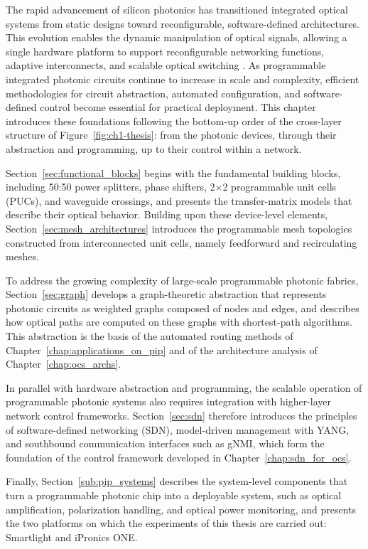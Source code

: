 The rapid advancement of silicon photonics has transitioned integrated optical systems from static designs toward reconfigurable, software-defined architectures.
This evolution enables the dynamic manipulation of optical signals, allowing a single hardware platform to support reconfigurable networking functions, adaptive interconnects, and scalable optical switching \cite{bogaerts2020programmable}.
As programmable integrated photonic circuits continue to increase in scale and complexity, efficient methodologies for circuit abstraction, automated configuration, and software-defined control become essential for practical deployment.
This chapter introduces these foundations following the bottom-up order of the cross-layer structure of Figure~\ref{fig:ch1-thesis}: from the photonic devices, through their abstraction and programming, up to their control within a network.

Section~\ref{sec:functional_blocks} begins with the fundamental building blocks, including 50:50 power splitters, phase shifters, 2$\times$2 programmable unit cells (PUCs), and waveguide crossings, and presents the transfer-matrix models that describe their optical behavior.
Building upon these device-level elements, Section~\ref{sec:mesh_architectures} introduces the programmable mesh topologies constructed from interconnected unit cells, namely feedforward and recirculating meshes.

To address the growing complexity of large-scale programmable photonic fabrics, Section~\ref{sec:graph} develops a graph-theoretic abstraction that represents photonic circuits as weighted graphs composed of nodes and edges, and describes how optical paths are computed on these graphs with shortest-path algorithms.
This abstraction is the basis of the automated routing methods of Chapter~\ref{chap:applications_on_pip} and of the architecture analysis of Chapter~\ref{chap:ocs_archs}.

In parallel with hardware abstraction and programming, the scalable operation of programmable photonic systems also requires integration with higher-layer network control frameworks.
Section~\ref{sec:sdn} therefore introduces the principles of software-defined networking (SDN), model-driven management with YANG, and southbound communication interfaces such as gNMI, which form the foundation of the control framework developed in Chapter~\ref{chap:sdn_for_ocs}.

Finally, Section~\ref{sub:pip_systems} describes the system-level components that turn a programmable photonic chip into a deployable system, such as optical amplification, polarization handling, and optical power monitoring, and presents the two platforms on which the experiments of this thesis are carried out: Smartlight and iPronics ONE.
